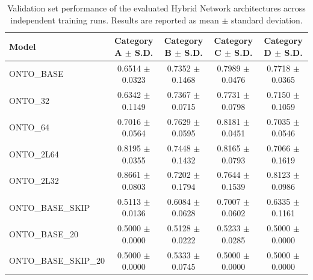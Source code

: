 \begin{table}[t]
\centering
\begin{tabular}{l c c c c}
\toprule
Model & Category A $\pm$ S.D. & Category B $\pm$ S.D. & Category C $\pm$ S.D. & Category D $\pm$ S.D. \\
\midrule
ONTO\_BASE & 0.6514 $\pm$ 0.0323 & 0.7352 $\pm$ 0.1468 & 0.7989 $\pm$ 0.0476 & 0.7718 $\pm$ 0.0365 \\
ONTO\_32 & 0.6342 $\pm$ 0.1149 & 0.7367 $\pm$ 0.0715 & 0.7731 $\pm$ 0.0798 & 0.7150 $\pm$ 0.1059 \\
ONTO\_64 & 0.7016 $\pm$ 0.0564 & 0.7629 $\pm$ 0.0595 & 0.8181 $\pm$ 0.0451 & 0.7035 $\pm$ 0.0546 \\
ONTO\_2L64 & 0.8195 $\pm$ 0.0355 & 0.7448 $\pm$ 0.1432 & 0.8165 $\pm$ 0.0793 & 0.7066 $\pm$ 0.1619 \\
ONTO\_2L32 & 0.8661 $\pm$ 0.0803 & 0.7202 $\pm$ 0.1794 & 0.7644 $\pm$ 0.1539 & 0.8123 $\pm$ 0.0986 \\
ONTO\_BASE\_SKIP & 0.5113 $\pm$ 0.0136 & 0.6084 $\pm$ 0.0628 & 0.7007 $\pm$ 0.0602 & 0.6335 $\pm$ 0.1161 \\
ONTO\_BASE\_20 & 0.5000 $\pm$ 0.0000 & 0.5128 $\pm$ 0.0222 & 0.5233 $\pm$ 0.0285 & 0.5000 $\pm$ 0.0000 \\
ONTO\_BASE\_SKIP\_20 & 0.5000 $\pm$ 0.0000 & 0.5333 $\pm$ 0.0745 & 0.5000 $\pm$ 0.0000 & 0.5000 $\pm$ 0.0000 \\
\bottomrule
\end{tabular}
\caption{Validation set performance of the evaluated Hybrid Network architectures across independent training runs. Results are reported as mean $\pm$ standard deviation.}
\label{tab:validation_results_hn_categoriesInLoss}
\end{table}